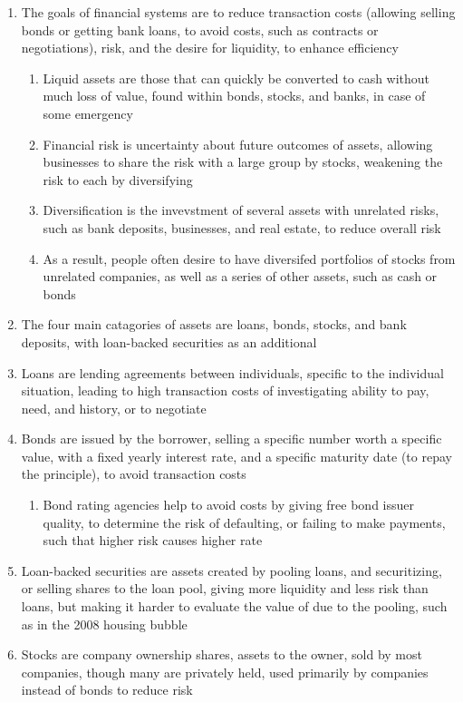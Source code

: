 \documentclass[11 pt, twoside]{article}
\begin{document}
\begin{enumerate}
\begin{enumerate}
\end{enumerate}
\item The goals of financial systems are to reduce transaction costs (allowing selling bonds or getting bank loans, to avoid costs, such as contracts or negotiations), risk, and the desire for liquidity, to enhance efficiency
\begin{enumerate}
\item Liquid assets are those that can quickly be converted to cash without much loss of value, found within bonds, stocks, and banks, in case of some emergency
\item Financial risk is uncertainty about future outcomes of assets, allowing businesses to share the risk with a large group by stocks, weakening the risk to each by diversifying
\item Diversification is the invevstment of several assets with unrelated risks, such as bank deposits, businesses, and real estate, to reduce overall risk
\item As a result, people often desire to have diversifed portfolios of stocks from unrelated companies, as well as a series of other assets, such as cash or bonds
\end{enumerate}
\item The four main catagories of assets are loans, bonds, stocks, and bank deposits, with loan-backed securities as an additional
\item Loans are lending agreements between individuals, specific to the individual situation, leading to high transaction costs of investigating ability to pay, need, and history, or to negotiate
\item Bonds are issued by the borrower, selling a specific number worth a specific value, with a fixed yearly interest rate, and a specific maturity date (to repay the principle), to avoid transaction costs 
\begin{enumerate}
\item Bond rating agencies help to avoid costs by giving free bond issuer quality, to determine the risk of defaulting, or failing to make payments, such that higher risk causes higher rate
\end{enumerate}
\item Loan-backed securities are assets created by pooling loans, and securitizing, or selling shares to the loan pool, giving more liquidity and less risk than loans, but making it harder to evaluate the value of due to the pooling, such as in the 2008 housing bubble
\item Stocks are company ownership shares, assets to the owner, sold by most companies, though many are privately held, used primarily by companies instead of bonds to reduce risk

\end{enumerate}
\end{document}
